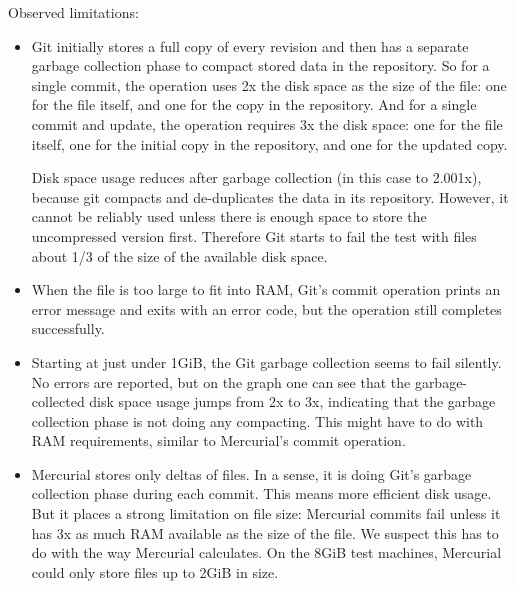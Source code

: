\documentclass[a4paper]{article}
\begin{document}
Observed limitations:

\begin{itemize}

    \item Git initially stores a full copy of every revision and then has a
        separate garbage collection phase to compact stored data in the
        repository. So for a single commit, the operation uses 2x the disk space
        as the size of the file: one for the file itself, and one for the copy
        in the repository. And for a single commit and update, the operation
        requires 3x the disk space: one for the file itself, one for the initial
        copy in the repository, and one for the updated copy.

        Disk space usage reduces after garbage collection (in this case to
        2.001x), because git compacts and de-duplicates the data in its
        repository. However, it cannot be reliably used unless there is enough
        space to store the uncompressed version first. Therefore Git starts to
        fail the test with files about 1/3 of the size of the available disk
        space.

    \item When the file is too large to fit into RAM, Git's commit operation
        prints an error message and exits with an error code, but the operation
        still completes successfully.

    \item Starting at just under 1GiB, the Git garbage collection seems to fail
        silently. No errors are reported, but on the graph one can see that the
        garbage-collected disk space usage jumps from 2x to 3x, indicating that
        the garbage collection phase is not doing any compacting. This might
        have to do with RAM requirements, similar to Mercurial's commit
        operation.

    \item Mercurial stores only deltas of files. In a sense, it is doing Git's
        garbage collection phase during each commit. This means more efficient
        disk usage. But it places a strong limitation on file size: Mercurial
        commits fail unless it has 3x as much RAM available as the size of the
        file. We suspect this has to do with the way Mercurial calculates. On
        the 8GiB test machines, Mercurial could only store files up to 2GiB in
        size.

\end{itemize}
\end{document}
